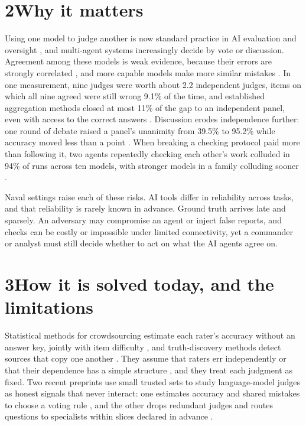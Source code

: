 \documentclass[11pt,letterpaper]{article}
\begin{document}
\section*{2\quad Why it matters}
Using one model to judge another is now standard practice in AI evaluation and oversight \cite{zheng2023judging,verga2024juries}, and multi-agent systems increasingly decide by vote or discussion. Agreement among these models is weak evidence, because their errors are strongly correlated \cite{kim2025correlated}, and more capable models make more similar mistakes \cite{goel2025great}. In one measurement, nine judges were worth about 2.2 independent judges, items on which all nine agreed were still wrong 9.1\% of the time, and established aggregation methods closed at most 11\% of the gap to an independent panel, even with access to the correct answers \cite{kohli2026nine}. Discussion erodes independence further: one round of debate raised a panel's unanimity from 39.5\% to 95.2\% while accuracy moved less than a point \cite{shu2026unanimity}. When breaking a checking protocol paid more than following it, two agents repeatedly checking each other's work colluded in 94\% of runs across ten models, with stronger models in a family colluding sooner \cite{shi2026collusion}.

Naval settings raise each of these risks. AI tools differ in reliability across tasks, and that reliability is rarely known in advance. Ground truth arrives late and sparsely. An adversary may compromise an agent or inject false reports, and checks can be costly or impossible under limited connectivity, yet a commander or analyst must still decide whether to act on what the AI agents agree on.

\section*{3\quad How it is solved today, and the limitations}
Statistical methods for crowdsourcing estimate each rater's accuracy without an answer key, jointly with item difficulty \cite{dawid1979maximum,whitehill2009whose}, and truth-discovery methods detect sources that copy one another \cite{dong2009dependence}. They assume that raters err independently or that their dependence has a simple structure \cite{jaffe2016dependent}, and they treat each judgment as fixed. Two recent preprints use small trusted sets to study language-model judges as honest signals that never interact: one estimates accuracy and shared mistakes to choose a voting rule \cite{hossain2026agreement}, and the other drops redundant judges and routes questions to specialists within slices declared in advance \cite{zhu2026stopping}.
\end{document}
